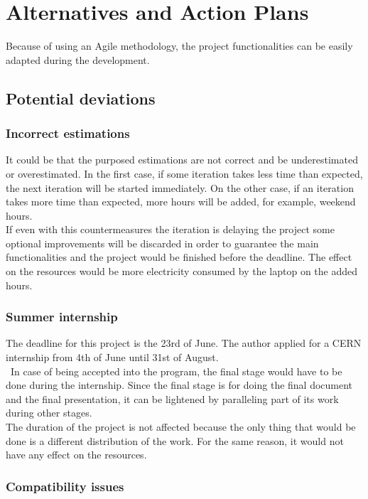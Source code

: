 \section{Alternatives and Action Plans}
Because of using an Agile methodology, the project functionalities can be easily adapted during the development. \\

\subsection{Potential deviations}
\subsubsection{Incorrect estimations}
It could be that the purposed estimations are not correct and be underestimated or overestimated. In the first case, if some iteration takes less time than expected, the next iteration will be started immediately. On the other case, if an iteration takes more time than expected, more hours will be added, for example, weekend hours. \\
If even with this countermeasures the iteration is delaying the project some optional improvements will be discarded in order to guarantee the main functionalities and the project would be finished before the deadline. 
The effect on the resources would be more electricity consumed by the laptop on the added hours. 

\subsubsection{Summer internship}

The deadline for this project is the 23rd of June. 
The author applied for a CERN internship from 4th of June until 31st of August. \\\
In case of being accepted into the program, the final stage would have to be done during the internship. Since the final stage is for doing the final document and the final presentation, it can be lightened by paralleling part of its work during other stages.\\
The duration of the project is not affected because the only thing that would be done is a different distribution of the work. For the same reason, it would not have any effect on the resources.

\subsubsection{Compatibility issues}

